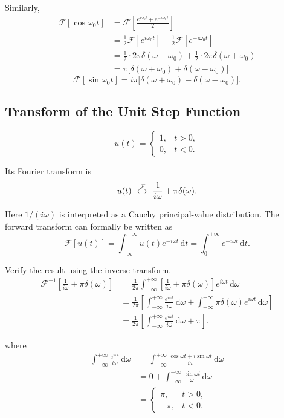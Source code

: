 \documentclass[11pt,a4paper]{article}
\theoremstyle{definition}
\theoremstyle{plain}
\begin{document}
Similarly,
\[
\begin{aligned}
\mathcal F[\cos\omega_0t]
&=\mathcal F\!\left[
\frac{e^{i\omega_0t}+e^{-i\omega_0t}}2
\right]\\
&=\frac12\mathcal F[e^{i\omega_0t}]
+\frac12\mathcal F[e^{-i\omega_0t}]\\
&=\frac12\cdot2\pi\delta(\omega-\omega_0)
+\frac12\cdot2\pi\delta(\omega+\omega_0)\\
&=\pi\bigl[\delta(\omega+\omega_0)+\delta(\omega-\omega_0)\bigr].
\end{aligned}
\]
\[
\mathcal F[\sin\omega_0t]
=i\pi\bigl[\delta(\omega+\omega_0)-\delta(\omega-\omega_0)\bigr].
\]

\subsection{Transform of the Unit Step Function}
\[
u(t)=
\begin{cases}
1,&t>0,\\
0,&t<0.
\end{cases}
\]

Its Fourier transform is
\[
u(t)
\ \xleftrightarrow{\mathcal F}\
\frac1{i\omega}+\pi\delta(\omega).
\]

Here \(1/(i\omega)\) is interpreted as a Cauchy principal-value distribution.
The forward transform can formally be written as
\[
\mathcal F[u(t)]
=\int_{-\infty}^{+\infty}u(t)e^{-i\omega t}\,\mathrm dt
=\int_0^{+\infty}e^{-i\omega t}\,\mathrm dt.
\]

Verify the result using the inverse transform.
\[
\begin{aligned}
\mathcal F^{-1}\!\left[
\frac1{i\omega}+\pi\delta(\omega)
\right]
&=\frac1{2\pi}\int_{-\infty}^{+\infty}
\left[\frac1{i\omega}+\pi\delta(\omega)\right]
e^{i\omega t}\,\mathrm d\omega\\
&=\frac1{2\pi}\left[
\int_{-\infty}^{+\infty}
\frac{e^{i\omega t}}{i\omega}\,\mathrm d\omega
+\int_{-\infty}^{+\infty}
\pi\delta(\omega)e^{i\omega t}\,\mathrm d\omega
\right]\\
&=\frac1{2\pi}\left[
\int_{-\infty}^{+\infty}
\frac{e^{i\omega t}}{i\omega}\,\mathrm d\omega+\pi
\right].
\end{aligned}
\]

where
\[
\begin{aligned}
\int_{-\infty}^{+\infty}
\frac{e^{i\omega t}}{i\omega}\,\mathrm d\omega
&=\int_{-\infty}^{+\infty}
\frac{\cos\omega t+i\sin\omega t}{i\omega}\,\mathrm d\omega\\
&=0+\int_{-\infty}^{+\infty}
\frac{\sin\omega t}{\omega}\,\mathrm d\omega\\
&=
\begin{cases}
\pi,&t>0,\\
-\pi,&t<0.
\end{cases}
\end{aligned}
\]
\end{document}
